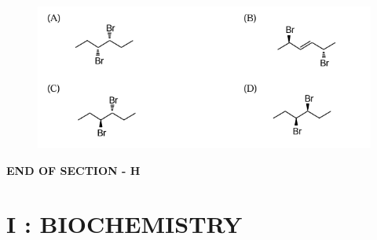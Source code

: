 \documentclass[journal,12pt,onecolumn]{IEEEtran}
\begin{document}
\begin{enumerate}[label=\arabic*.]
\begin{figure}[H]
    \centering
    \includegraphics[width=0.7\columnwidth]{FIG/H-15.png}
    \caption*{}
    \label{fig:H-15}
\end{figure}
\end{enumerate}

\begin{center}
\textbf{END OF SECTION - H}
\end{center}
\newpage
\section*{\centering I : BIOCHEMISTRY}
\end{document}
